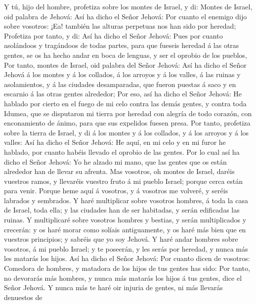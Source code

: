  Y tú, hijo del hombre, profetiza sobre los montes de
Israel, y di: Montes de Israel, oid palabra de Jehová: 
Así ha dicho el Señor Jehová: Por cuanto el enemigo dijo sobre vosotros:
¡Ea! también las alturas perpetuas nos han sido por heredad;
 Profetiza por tanto, y di: Así ha dicho el Señor Jehová:
Pues por cuanto asolándoos y tragándoos de todas partes, para que
fueseis heredad á las otras gentes, se os ha hecho andar en boca de
lenguas, y ser el oprobio de los pueblos,  Por tanto,
montes de Israel, oid palabra del Señor Jehová: Así ha dicho el Señor
Jehová á los montes y á los collados, á los arroyos y á los valles, á
las ruinas y asolamientos, y á las ciudades desamparadas, que fueron
puestas á saco y en escarnio á las otras gentes alrededor;
 Por eso, así ha dicho el Señor Jehová: He hablado por
cierto en el fuego de mi celo contra las demás gentes, y contra toda
Idumea, que se disputaron mi tierra por heredad con alegría de todo
corazón, con enconamiento de ánimo, para que sus expelidos fuesen presa.
 Por tanto, profetiza sobre la tierra de Israel, y di á
los montes y á los collados, y á los arroyos y á los valles: Así ha
dicho el Señor Jehová: He aquí, en mi celo y en mi furor he hablado, por
cuanto habéis llevado el oprobio de las gentes.  Por lo
cual así ha dicho el Señor Jehová: Yo he alzado mi mano, que las gentes
que os están alrededor han de llevar su afrenta.  Mas
vosotros, oh montes de Israel, daréis vuestros ramos, y llevaréis
vuestro fruto á mi pueblo Israel; porque cerca están para venir.
 Porque heme aquí á vosotros, y á vosotros me volveré, y
seréis labrados y sembrados.  Y haré multiplicar sobre
vosotros hombres, á toda la casa de Israel, toda ella; y las ciudades
han de ser habitadas, y serán edificadas las ruinas.  Y
multiplicaré sobre vosotros hombres y bestias, y serán multiplicados y
crecerán: y os haré morar como solíais antiguamente, y os haré más bien
que en vuestros principios; y sabréis que yo soy Jehová. 
Y haré andar hombres sobre vosotros, á mi pueblo Israel; y te poseerán,
y les serás por heredad, y nunca más les matarás los hijos.
 Así ha dicho el Señor Jehová: Por cuanto dicen de
vosotros: Comedora de hombres, y matadora de los hijos de tus gentes has
sido:  Por tanto, no devorarás más hombres, y nunca más
matarás los hijos á tus gentes, dice el Señor Jehová.  Y
nunca más te haré oir injuria de gentes, ni más llevarás denuestos de
